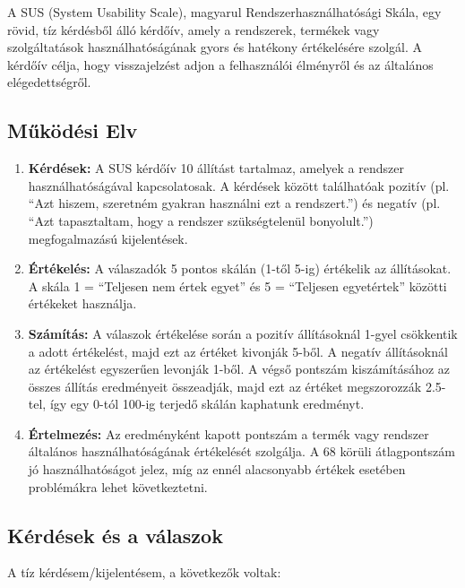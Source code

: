 A SUS (System Usability Scale), magyarul Rendszerhasználhatósági Skála, egy rövid, tíz kérdésből álló kérdőív, amely a rendszerek, termékek vagy szolgáltatások használhatóságának gyors és hatékony értékelésére szolgál. 
A kérdőív célja, hogy visszajelzést adjon a felhasználói élményről és az általános elégedettségről.

\subsection{Működési Elv}
\begin{enumerate}
    \item \textbf{Kérdések:} A SUS kérdőív 10 állítást tartalmaz, amelyek a rendszer használhatóságával kapcsolatosak. A kérdések között találhatóak pozitív (pl. ``Azt hiszem, szeretném gyakran használni ezt a rendszert.'') és negatív (pl. ``Azt tapasztaltam, hogy a rendszer szükségtelenül bonyolult.'') megfogalmazású kijelentések.
    
    \item \textbf{Értékelés:} A válaszadók 5 pontos skálán (1-től 5-ig) értékelik az állításokat. A skála 1 = ``Teljesen nem értek egyet'' és 5 = ``Teljesen egyetértek'' közötti értékeket használja.
    
    \item \textbf{Számítás:} A válaszok értékelése során a pozitív állításoknál 1-gyel csökkentik a adott értékelést, majd ezt az értéket kivonják 5-ből. A negatív állításoknál az értékelést egyszerűen levonják 1-ből. A végső pontszám kiszámításához az összes állítás eredményeit összeadják, majd ezt az értéket megszorozzák 2.5-tel, így egy 0-tól 100-ig terjedő skálán kaphatunk eredményt.
    
    \item \textbf{Értelmezés:} Az eredményként kapott pontszám a termék vagy rendszer általános használhatóságának értékelését szolgálja. A 68 körüli átlagpontszám jó használhatóságot jelez, míg az ennél alacsonyabb értékek esetében problémákra lehet következtetni.
\end{enumerate}

\subsection{Kérdések és a válaszok}
A tíz kérdésem/kijelentésem, a következők voltak:

